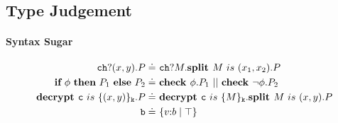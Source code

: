 \documentclass[master,english]{kuisthesis}
\theoremstyle{definition}
\begin{document}
\subsection{Type Judgement}
\paragraph{Syntax Sugar}

\begin{align*}
    \Code{ch}?(x, y).P \doteq&\ \Code{ch}?M.\splitP{M}{x_1}{x_2}.P
    \\\iteP{\phi}{P_1}{P_2} \doteq&\ \checkP{\phi}.P_1 ~||~ \checkP{\neg \phi}.P_2
    \\\decryptP{\Code{c}}{(x, y)}{\Code{k}}.P \doteq&\ \decryptP{\Code{c}}{M}{\Code{k}}.\splitP{M}{x}{y}.P
    \\\Code{b} \doteq& \ \rawnuot{b}{\top}
\end{align*}
\end{document}
